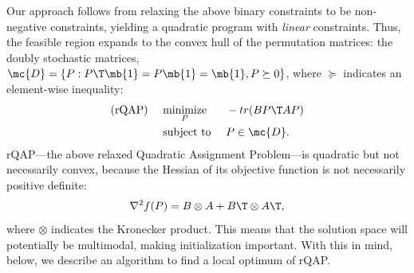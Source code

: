\documentclass[10pt,journal,cspaper,compsoc]{IEEEtran}
\begin{document}
Our approach follows from relaxing the above binary constraints
to be non-negative constraints, yielding a quadratic program with \emph{linear} constraints.  %
Thus, the feasible region expands to the convex hull of the permutation matrices: the doubly stochastic matrices, $\mc{D}=\{P : P\T \mb{1} =  P \mb{1} = \mb{1}, P \succeq 0\}$, where $\succeq$ indicates an element-wise inequality:
\begin{subequations} \label{eq:FAQ}
\begin{align}
		\text{(rQAP) } \quad &\underset{P}{\text{minimize}}  && - tr(B P\T AP) \label{eq:FAQ1}  \\
		&\text{subject to } && P \in \mc{D}.
\end{align}
\end{subequations}
% 
rQAP---the above relaxed Quadratic Assignment Problem---is quadratic but not necessarily convex, 
because the Hessian of its objective function is not necessarily positive definite:
\begin{align}
	\nabla^2 f(P)  =  B \otimes A + B\T \otimes A\T,
\end{align}
where $\otimes$ indicates the Kronecker product. This means that the solution space will potentially be multimodal, making initialization important.  With this in mind, below, we describe an algorithm to find a local optimum of rQAP.
\end{document}
